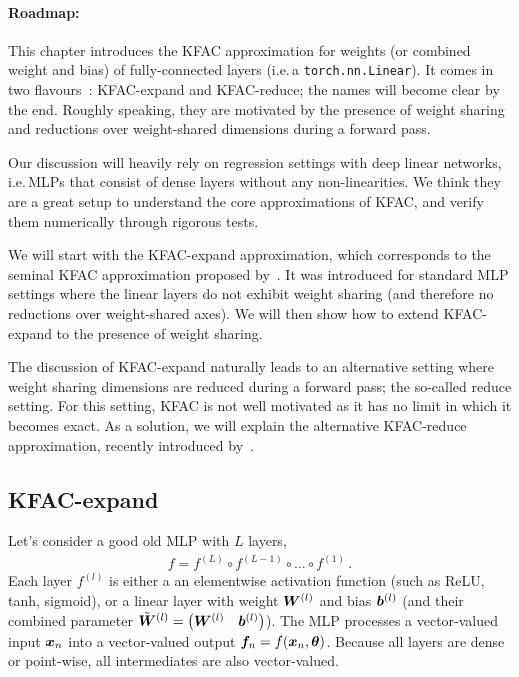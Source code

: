 \paragraph{Roadmap:} This chapter introduces the KFAC approximation for weights (or combined weight and bias) of fully-connected layers (i.e.\,a \texttt{torch.nn.Linear}).
It comes in two flavours~\cite{eschenhagen2023kroneckerfactored}: KFAC-expand and KFAC-reduce; the names will become clear by the end.
Roughly speaking, they are motivated by the presence of weight sharing and reductions over weight-shared dimensions during a forward pass.

Our discussion will heavily rely on regression settings with deep linear networks, i.e.\,MLPs that consist of dense layers without any non-linearities.
We think they are a great setup to understand the core approximations of KFAC, and verify them numerically through rigorous tests.

We will start with the KFAC-expand approximation, which corresponds to the seminal KFAC approximation proposed by~\citet{martens2015optimizing}. It was introduced for standard MLP settings where the linear layers do not exhibit weight sharing (and therefore no reductions over weight-shared axes).
We will then show how to extend KFAC-expand to the presence of weight sharing.

The discussion of KFAC-expand naturally leads to an alternative setting where weight sharing dimensions are reduced during a forward pass; the so-called reduce setting.
For this setting, KFAC is not well motivated as it has no limit in which it becomes exact.
As a solution, we will explain the alternative KFAC-reduce approximation, recently introduced by~\citet{eschenhagen2023kroneckerfactored}.

\subsection{KFAC-expand}

Let's consider a good old MLP with $L$ layers,
\begin{align*}
  f = f^{(L)} \circ f^{(L-1)} \circ \ldots \circ f^{(1)} \,.
\end{align*}
Each layer $f^{(l)}$ is either a an elementwise activation function (such as ReLU, tanh, sigmoid), or a linear layer with weight ${\bm{W}}^{(l)}$ and bias ${\bm{b}}^{(l)}$ (and their combined parameter $\tilde{{\bm{W}}}^{(l)} = \begin{pmatrix} {\bm{W}}^{(l)} & {\bm{b}}^{(l)} \end{pmatrix}$).
The MLP processes a vector-valued input ${\bm{x}}_n$ into a vector-valued output ${\bm{f}}_n = f({\bm{x}}_n, {\bm{\theta}})$.
Because all layers are dense or point-wise, all intermediates are also vector-valued.

